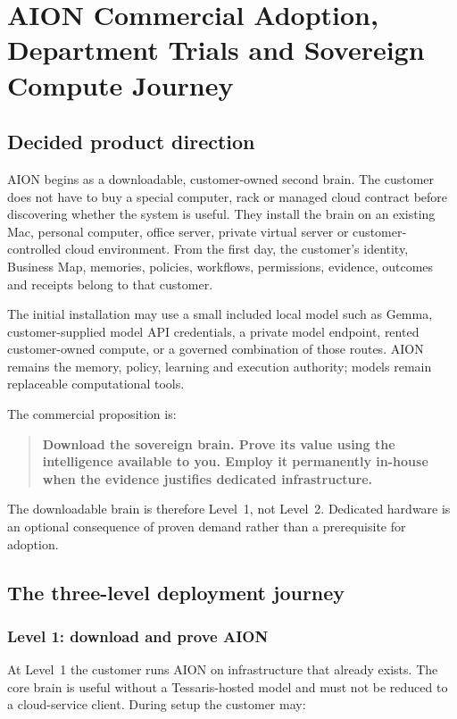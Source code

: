 \section{AION Commercial Adoption, Department Trials and Sovereign Compute Journey}

\subsection{Decided product direction}

AION begins as a downloadable, customer-owned second brain. The customer does not have to buy a
special computer, rack or managed cloud contract before discovering whether the system is useful.
They install the brain on an existing Mac, personal computer, office server, private virtual
server or customer-controlled cloud environment. From the first day, the customer's identity,
Business Map, memories, policies, workflows, permissions, evidence, outcomes and receipts belong
to that customer.

The initial installation may use a small included local model such as Gemma, customer-supplied
model API credentials, a private model endpoint, rented customer-owned compute, or a governed
combination of those routes. AION remains the memory, policy, learning and execution authority;
models remain replaceable computational tools.

The commercial proposition is:

\begin{quote}
\textbf{Download the sovereign brain. Prove its value using the intelligence available to you.
Employ it permanently in-house when the evidence justifies dedicated infrastructure.}
\end{quote}

The downloadable brain is therefore Level~1, not Level~2. Dedicated hardware is an optional
consequence of proven demand rather than a prerequisite for adoption.

\subsection{The three-level deployment journey}

\subsubsection{Level 1: download and prove AION}

At Level~1 the customer runs AION on infrastructure that already exists. The core brain is useful
without a Tessaris-hosted model and must not be reduced to a cloud-service client. During setup the
customer may:

